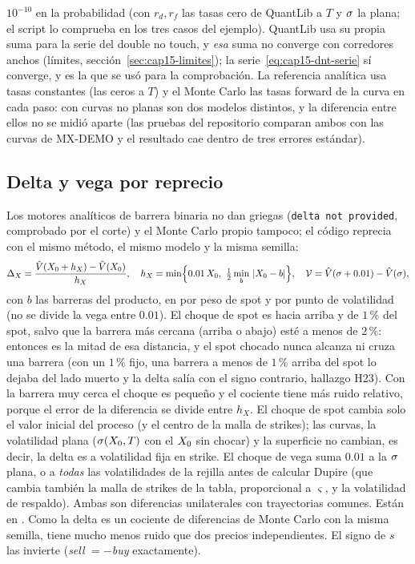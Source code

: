 $10^{-10}$ en la probabilidad (con $r_d,r_f$ las tasas cero de QuantLib a $T$ y $\sigma$ la plana; el script lo comprueba en los tres casos del ejemplo). QuantLib usa su
propia suma para la serie del double no touch, y \emph{esa} suma no converge con corredores anchos (límites, sección~\ref{sec:cap15-limites}); la
serie~\eqref{eq:cap15-dnt-serie} sí converge, y es la que se usó para la comprobación. La referencia analítica usa tasas
constantes (las ceros a $T$) y el Monte Carlo las tasas forward de la curva en cada paso: con curvas no planas son dos modelos distintos, y
la diferencia entre ellos no se midió aparte (las pruebas del repositorio comparan ambos con las curvas de MX-DEMO y el resultado cae dentro de tres errores estándar).

\subsection{Delta y vega por reprecio}\label{sec:cap15-griegas}

Los motores analíticos de barrera binaria no dan griegas (\texttt{delta not provided}, comprobado por el corte) y el Monte Carlo propio
tampoco; el código reprecia con el mismo método, el mismo modelo y la misma semilla:
\begin{equation}\label{eq:cap15-griegas}
  \Delta_X=\frac{\hat{V}(X_0+h_X)-\hat{V}(X_0)}{h_X},\quad
  h_X=\min\Bigl\{0.01\,X_0,\ \tfrac12\min_{b}\,|X_0-b|\Bigr\},\quad
  \mathcal V=\hat{V}(\sigma+0.01)-\hat{V}(\sigma),
\end{equation}
con $b$ las barreras del producto, en \MXN{} por peso de spot y por punto de volatilidad (no se divide la vega entre $0.01$). El choque de spot es hacia arriba y de $1\,\%$ del spot,
salvo que la barrera más cercana (arriba o abajo) esté a menos de $2\,\%$: entonces es la mitad de esa distancia, y el spot chocado nunca alcanza ni cruza una barrera (con un
$1\,\%$ fijo, una barrera a menos de $1\,\%$ arriba del spot lo dejaba del lado muerto y la delta salía con el signo contrario, hallazgo H23). Con la barrera muy cerca el choque
es pequeño y el cociente tiene más ruido relativo, porque el error de la diferencia se divide entre $h_X$. El choque de spot cambia solo el valor inicial del
proceso (y el centro de la malla de strikes); las curvas, la volatilidad plana ($\sigma(X_0,T)$ con el $X_0$ sin chocar) y la superficie no
cambian, es decir, la delta es a volatilidad fija en strike. El choque de vega suma $0.01$ a la $\sigma$ plana, o a \emph{todas} las
volatilidades de la rejilla antes de calcular Dupire (que cambia también la malla de strikes de la tabla, proporcional a $\varsigma$, y la
volatilidad de respaldo). Ambas son diferencias unilaterales con trayectorias comunes. Están en
. Como la delta es un cociente de diferencias de Monte Carlo con la misma semilla, tiene mucho menos ruido que
dos precios independientes. El signo de $s$ las invierte (\emph{sell} $=-$\emph{buy} exactamente).

